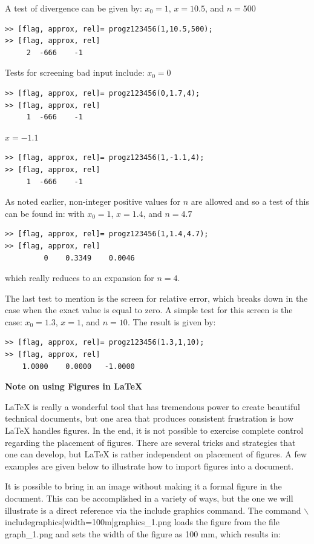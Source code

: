 \documentclass{article}
\def\ds{\displaystyle}
\begin{document}
A test of divergence can be given by: $\ds x_0 = 1$, $x=10.5$, and $n=500$
\begin{verbatim}
>> [flag, approx, rel]= progz123456(1,10.5,500);
>> [flag, approx, rel]
     2  -666    -1
\end{verbatim}

Tests for screening bad input include: 
$\ds x_0=0$
\begin{verbatim}
>> [flag, approx, rel]= progz123456(0,1.7,4);
>> [flag, approx, rel]
     1  -666    -1
\end{verbatim}
$x=-1.1$
\begin{verbatim}
>> [flag, approx, rel]= progz123456(1,-1.1,4);
>> [flag, approx, rel]
     1  -666    -1
\end{verbatim}
As noted earlier, non-integer positive values for $n$ are allowed and so a test of this can be found in: with $\ds x_0=1$, $x=1.4$, and $n=4.7$
\begin{verbatim}
>> [flag, approx, rel]= progz123456(1,1.4,4.7);
>> [flag, approx, rel]
         0    0.3349    0.0046
\end{verbatim}
which really reduces to an expansion for $n=4$. 

The last test to mention is the screen for relative error, which breaks down in the case when the exact value is equal to zero. A simple test for this screen is the case: $\ds x_0 = 1.3$, $x=1$, and $n=10$. The result is given by:
\begin{verbatim}
>> [flag, approx, rel]= progz123456(1.3,1,10);
>> [flag, approx, rel]
    1.0000    0.0000   -1.0000
\end{verbatim}

\vfill \eject
{\color{teal}
{\bf Note on using Figures in LaTeX}}

LaTeX is really a wonderful tool that has tremendous power to create beautiful technical documents, but one area that produces consistent frustration is how LaTeX handles figures. In the end, it is not possible to exercise complete control regarding the placement of figures. There are several tricks and strategies that one can develop, but LaTeX is rather independent on placement of figures. A few examples are given below to illustrate how to import figures into a document. 

It is possible to bring in an image without making it a formal figure in the document. This can be accomplished in a variety of ways, but the one we will illustrate is a direct reference via the include graphics command. The command $\backslash$includegraphics[width=100m]{graphics\_1.png} loads the figure from the file graph\_1.png and sets the width of the figure as 100 mm, which results in:  
\end{document}
